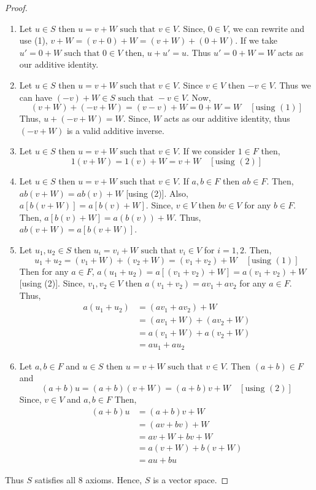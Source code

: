 \documentclass[12pt, a4paper]{article}
\theoremstyle{definition}
\theoremstyle{remark}
\newcommand{\st}{\text{ such that }}
\begin{document}
\begin{proof}
\begin{enumerate}[label=(\alph*).]
			\item Let $u \in S$ then $u = v+W \st v \in V$. Since, $0 \in V$, we can rewrite and use (1), $v+W = (v+0)+W = (v+W)+(0+W)$. If we take $u' = 0+W \st 0 \in V$ then, $u+u' = u$. Thus $u' = 0+W = W$ acts as our additive identity.
			
			\item Let $u \in S$ then $u = v+W \st v \in V$. Since $v \in V$ then $-v \in V$.
			Thus we can have $(-v)+W \in S \st -v \in V$.
			Now,
			\[ (v+W) + (-v+W) = (v-v)+W = 0+W = W \quad [\text{using } (1)] \]
			Thus, $u + (-v+W) = W$.
			Since, $W$ acts as our additive identity, thus $(-v+W)$ is a valid additive inverse.
			
			\item Let $u \in S$ then $u = v+W \st v \in V$. If we consider $1 \in F$ then,
			\[ 1(v+W) = 1(v) + W = v+W \quad [\text{using } (2)] \]
			
			\item Let $u \in S$ then $u = v+W \st v \in V$. If $a, b \in F$ then $ab \in F$.
			Then, $ab(v+W) = ab(v) + W$ [using (2)].
			Also, $a[b(v+W)] = a[b(v)+W]$. Since, $v \in V$ then $bv \in V$ for any $b \in F$.
			Then, $a[b(v)+W] = a(b(v)) + W$. Thus, $ab(v+W) = a[b(v+W)]$.
			
			\item Let $u_1, u_2 \in S$ then $u_i = v_i+W \st v_i \in V$ for $i=1,2$. Then,
			\[ u_1+u_2 = (v_1+W) + (v_2+W) = (v_1+v_2)+W \quad [\text{using } (1)] \]
			Then for any $a \in F$, $a(u_1+u_2) = a[(v_1+v_2)+W] = a(v_1+v_2)+W$ [using (2)].
			Since, $v_1, v_2 \in V$ then $a(v_1+v_2) = av_1+av_2$ for any $a \in F$.
			Thus,
			\begin{align*}
				a(u_1+u_2) &= (av_1+av_2)+W \\
				&= (av_1+W) + (av_2+W) \\
				&= a(v_1+W) + a(v_2+W) \\
				&= au_1 + au_2
			\end{align*}
			
			\item Let $a, b \in F$ and $u \in S$ then $u = v+W \st v \in V$. Then $(a+b) \in F$ and
			\[ (a+b)u = (a+b)(v+W) = (a+b)v + W \quad [\text{using } (2)] \]
			Since, $v \in V$ and $a,b \in F$
			Then,
			\begin{align*}
				(a+b)u &= (a+b)v+W \\
				&= (av+bv)+W \\
				&= av+W + bv+W \\
				&= a(v+W) + b(v+W) \\
				&= au + bu
			\end{align*}
		\end{enumerate}
		Thus $S$ satisfies all 8 axioms. Hence, $S$ is a vector space.
	\end{proof}
	
\end{document}

